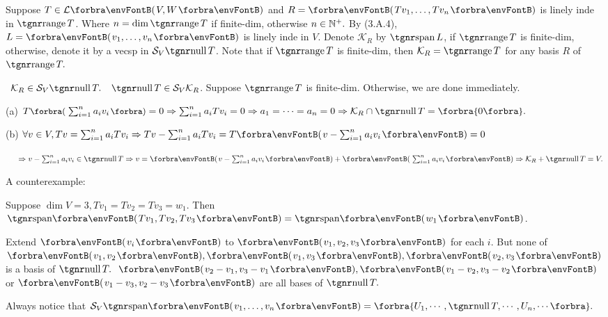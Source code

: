 \documentclass[a4paper, 11pt, UTF8]{article}
\begin{document}
\begin{large}
\BulletPointX\NewNotation\TextB{}
Suppose $T\in\Lm{V,W}$ and $R=\Par{Tv_1,\dots,Tv_n}$ is linely inde in $\range T$.\TextB{}
Where $n=\dim\range T$ if finite-dim, otherwise $n\in{\mathbb{N}^+}.$\TextB{}
By (3.A.4), $L=\Par{v_1,\dots,v_n}$ is linely inde in $V$.\TextB{}
Denote $\mathcal{K}_R$ by $\Spn L$, if $\range T$ is finite-dim, otherwise, denote it by a vecsp in $\mathcal{S}_V\null T$.\TextB{}
Note that if $\range T$ is finite-dim, then $\mathcal{K}_R=\range T$ for any basis $R$ of $\range T.$\par\vspace{6pt}
\BulletPointX\NewTheorem\,\,\,{\Large$\mathcal{K}_R\in\mathcal{S}_V\null T.$} \qquad\Comment\,\,\,$\null T\in\mathcal{S}_V \mathcal{K}_R$.\TextB{}
Suppose $\range T$ is finite-dim. Otherwise, we are done immediately.\par\vspace{6pt}\TextB{}
(a) $T\BigPar{\sum_{i=1}^n a_i v_i}=0\Rightarrow \sum_{i=1}^n a_i Tv_i=0\Rightarrow a_1=\dots=a_n=0\Rightarrow\mathcal{K}_R\cap\null T=\zeroSubs.$\par\vspace{6pt}\TextB{}
(b) $\forall v\in V, Tv=\sum_{i=1}^n a_i Tv_i\Rightarrow Tv-\sum_{i=1}^n a_i Tv_i=T\Par{v-\sum_{i=1}^n a_i v_i}=0$\par\vspace{6pt}\TextB{}
$\Hb\Rightarrow v-\sum_{i=1}^n a_i v_i\in\null T\Rightarrow v=\Par{v-\sum_{i=1}^n a_i v_i}+\Par{\sum_{i=1}^n a_i v_i}\Rightarrow\mathcal{K}_R+\null T=V.$\PfEnd
\SepLine

A counterexample:\par\quad
Suppose $\dim V=3, Tv_1=Tv_2=Tv_3=w_1.$ Then $\Span{Tv_1,Tv_2,Tv_3}=\Span{w_1}$.\par\quad
Extend $\Par{v_i}$ to $\Par{v_1,v_2,v_3}$ for each $i$. But none of $\Par{v_1,v_2},\Par{v_1,v_3},\Par{v_2,v_3}$ is a basis of $\null T.$\PfEnd[-15pt]
\Comment \,\,\,$\Par{v_2-v_1,v_3-v_1},\Par{v_1-v_2,v_3-v_2}$ or $\Par{v_1-v_3,v_2-v_3}$ are all bases of $\null T.$\par\Blind{\Comment\,\,}
Always notice that $\mathcal{S}_V\Span{v_1,\dots,v_n}=\Bra{U_1,\cdots,\null T,\cdots,U_n,\cdots}.$\par
\SepLine


\end{large}
\end{document}
